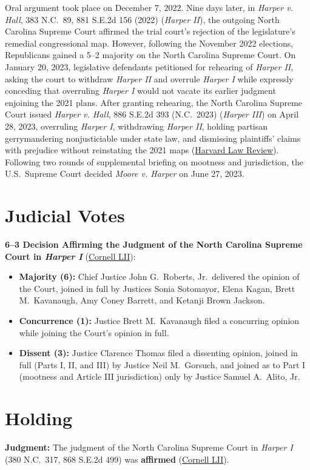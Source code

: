 \documentclass[12pt]{article}
\begin{document}
Oral argument took place on December 7, 2022. Nine days later, in \textit{Harper v. Hall}, 383 N.C.\ 89, 881 S.E.2d 156 (2022) (\textit{Harper II}), the outgoing North Carolina Supreme Court affirmed the trial court's rejection of the legislature's remedial congressional map. However, following the November 2022 elections, Republicans gained a 5--2 majority on the North Carolina Supreme Court. On January 20, 2023, legislative defendants petitioned for rehearing of \textit{Harper II}, asking the court to withdraw \textit{Harper II} and overrule \textit{Harper I} while expressly conceding that overruling \textit{Harper I} would not vacate its earlier judgment enjoining the 2021 plans. After granting rehearing, the North Carolina Supreme Court issued \textit{Harper v. Hall}, 886 S.E.2d 393 (N.C.\ 2023) (\textit{Harper III}) on April 28, 2023, overruling \textit{Harper I}, withdrawing \textit{Harper II}, holding partisan gerrymandering nonjusticiable under state law, and dismissing plaintiffs' claims with prejudice without reinstating the 2021 maps (\href{https://harvardlawreview.org/print/vol-137/moore-v-harper/}{Harvard Law Review}). Following two rounds of supplemental briefing on mootness and jurisdiction, the U.S.\ Supreme Court decided \textit{Moore v. Harper} on June 27, 2023.

\section{Judicial Votes}
\textbf{6--3 Decision Affirming the Judgment of the North Carolina Supreme Court in \textit{Harper I}} (\href{https://www.law.cornell.edu/supremecourt/text/21-1271}{Cornell LII}):
\begin{itemize}
\item \textbf{Majority (6):} Chief Justice John G.\ Roberts, Jr.\ delivered the opinion of the Court, joined in full by Justices Sonia Sotomayor, Elena Kagan, Brett M.\ Kavanaugh, Amy Coney Barrett, and Ketanji Brown Jackson.
\item \textbf{Concurrence (1):} Justice Brett M.\ Kavanaugh filed a concurring opinion while joining the Court's opinion in full.
\item \textbf{Dissent (3):} Justice Clarence Thomas filed a dissenting opinion, joined in full (Parts I, II, and III) by Justice Neil M.\ Gorsuch, and joined as to Part I (mootness and Article III jurisdiction) only by Justice Samuel A.\ Alito, Jr.
\end{itemize}

\section{Holding}
\textbf{Judgment:} The judgment of the North Carolina Supreme Court in \textit{Harper I} (380 N.C.\ 317, 868 S.E.2d 499) was \textbf{affirmed} (\href{https://www.law.cornell.edu/supremecourt/text/21-1271}{Cornell LII}).
\end{document}
